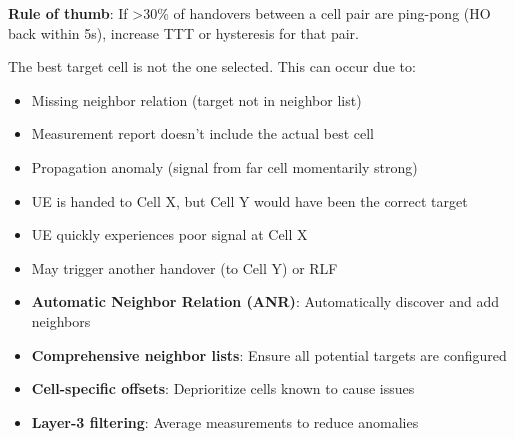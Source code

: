 \textbf{Rule of thumb}: If \textgreater{}30\% of handovers between a cell pair are ping-pong (HO back within 5s), increase TTT or hysteresis for that pair.



\CNchained{}

The best target cell is not the one selected. This can occur due to:

\begin{itemize}
\tightlist
\item
  Missing neighbor relation (target not in neighbor list)
\item
  Measurement report doesn’t include the actual best cell
\item
  Propagation anomaly (signal from far cell momentarily strong)
\end{itemize}


\begin{itemize}
\tightlist
\item
  UE is handed to Cell X, but Cell Y would have been the correct target
\item
  UE quickly experiences poor signal at Cell X
\item
  May trigger another handover (to Cell Y) or RLF
\end{itemize}


\begin{itemize}
\tightlist
\item
  \textbf{Automatic Neighbor Relation (ANR)}: Automatically discover and add neighbors
\item
  \textbf{Comprehensive neighbor lists}: Ensure all potential targets are configured
\item
  \textbf{Cell-specific offsets}: Deprioritize cells known to cause issues
\item
  \textbf{Layer-3 filtering}: Average measurements to reduce anomalies
\end{itemize}





